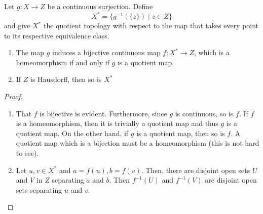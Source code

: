 \begin{corollary}
    Let $g: X\to Z$ be a continuous surjection. Define 
    \begin{equation*}
        X^* = \{g^{-1}(\{z\})\mid z\in Z\}
    \end{equation*}
    and give $X^*$ the quotient topology with respect to the map that takes every point to its respective equivalence class.
    \begin{enumerate}[label=(\alph*)]
        \item The map $g$ induces a bijective continuous map $f: X^*\to Z$, which is a homeomorphism if and only if $g$ is a quotient map. 
        \item If $Z$ is Hausdorff, then so is $X^*$
    \end{enumerate}
\end{corollary}
\begin{proof}
\hfill 
\begin{enumerate}[label=(\alph*)]
\item That $f$ is bijective is evident. Furthermore, since $g$ is continuous, so is $f$. If $f$ is a homeomorphism, then it is trivially a quotient map and thus $g$ is a quotient map. On the other hand, if $g$ is a quotient map, then so is $f$. A quotient map which is a bijection must be a homeomorphism (this is not hard to see).

\item Let $u,v\in X^*$ and $a = f(u), b = f(v)$. Then, there are disjoint open sets $U$ and $V$ in $Z$ separating $a$ and $b$. Then $f^{-1}(U)$ and $f^{-1}(V)$ are disjoint open sets separating $u$ and $v$.
\end{enumerate}
\end{proof}